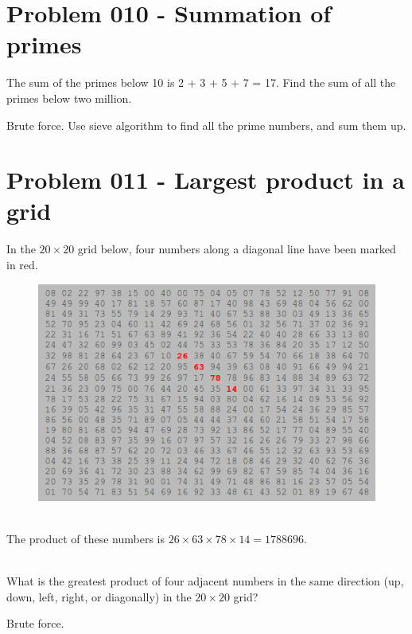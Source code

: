 \section{Problem 010 - Summation of primes}
\begin{prob}
The sum of the primes below 10 is 2 + 3 + 5 + 7 = 17.
Find the sum of all the primes below two million.
\end{prob}
\begin{sol}
Brute force. Use sieve algorithm to find all the prime numbers, and sum them up.
\end{sol}
\newpage
\section{Problem 011 - Largest product in a grid}
\begin{prob}
In the $20\times20$ grid below, four numbers along a diagonal line have been marked in red.
\begin{figure}[htb]
\includegraphics[scale = 0.73]{pic/010.png}
\end{figure}
\noindent\\The product of these numbers is $26 \times 63 \times 78 \times 14 = 1788696$.

\noindent\\What is the greatest product of four adjacent numbers in the same direction (up, down, left, right, or diagonally) in the $20 \times 20$ grid?
\end{prob}

\begin{sol}
Brute force.
\end{sol}

\newpage
